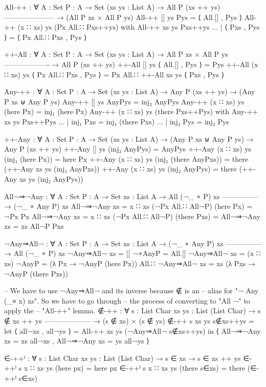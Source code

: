 \begin{code}
  All-++ : ∀ {A : Set} {P : A → Set} (xs ys : List A)
    → All P (xs ++ ys)
      ---------------------
    → (All P xs × All P ys)
  All-++ [] ys Pys = ⟨ All.[] , Pys ⟩
  All-++ (x ∷ xs) ys (Px All.∷ Pxs++ys) with All-++ xs ys Pxs++ys
  ... | ⟨ Pxs , Pys ⟩ = ⟨ Px All.∷ Pxs , Pys ⟩

  ++-All : ∀ {A : Set} {P : A → Set} (xs ys : List A)
    → All P xs × All P ys
      -------------------
    → All P (xs ++ ys)
  ++-All [] ys ⟨ All.[] , Pys ⟩ = Pys
  ++-All (x ∷ xs) ys ⟨ Px All.∷ Pxs , Pys ⟩ =
    Px All.∷ ++-All xs ys ⟨ Pxs , Pys ⟩

  Any-++ : ∀ {A : Set} {P : A → Set} (xs ys : List A)
    → Any P (xs ++ ys) → (Any P xs ⊎ Any P ys)
  Any-++ [] ys AnyPys = inj₂ AnyPys
  Any-++ (x ∷ xs) ys (here Px) = inj₁ (here Px)
  Any-++ (x ∷ xs) ys (there Pxs++Pys) with Any-++ xs ys Pxs++Pys
  ... | inj₁ Pxs = inj₁ (there Pxs)
  ... | inj₂ Pys = inj₂ Pys

  ++-Any : ∀ {A : Set} {P : A → Set} (xs ys : List A)
    → (Any P xs ⊎ Any P ys) → Any P (xs ++ ys)
  ++-Any [] ys (inj₂ AnyPys) = AnyPys
  ++-Any (x ∷ xs) ys (inj₁ (here Px)) = here Px
  ++-Any (x ∷ xs) ys (inj₁ (there AnyPxs)) = there (++-Any xs ys (inj₁ AnyPxs))
  ++-Any (x ∷ xs) ys (inj₂ AnyPys) = there (++-Any xs ys (inj₂ AnyPys))

  All¬⇒¬Any : ∀ {A : Set} {P : A → Set} {xs : List A}
    → All (¬_ ∘ P) xs
      ---------------
    → (¬_ ∘ Any P) xs
  All¬⇒¬Any {xs = x ∷ xs} (¬Px All.∷ All¬P) (here Px) = ¬Px Px
  All¬⇒¬Any {xs = x ∷ xs} (¬Px All.∷ All¬P) (there Pxs) =
    All¬⇒¬Any {xs = xs} All¬P Pxs

  ¬Any⇒All¬ : ∀ {A : Set} {P : A → Set} {xs : List A}
    → (¬_ ∘ Any P) xs
      ---------------
    → All (¬_ ∘ P) xs
  ¬Any⇒All¬ {xs = []} ¬∘AnyP = All.[]
  ¬Any⇒All¬ {xs = (x ∷ xs)} ¬AnyP =
    (λ Px → ¬AnyP (here Px))
      All.∷ ¬Any⇒All¬ {xs = xs} (λ Pxs → ¬AnyP (there Pxs))

  -- We have to use ¬Any⇒All¬ and its inverse because ∉ is an
  -- alias for "¬ Any (_≡ x) xs".  So we have to go through
  -- the process of converting to "All ¬" to apply the
  -- "All-++" lemma.
  ∉-++ : ∀ {s : List Char} {xs ys : List (List Char)}
    → s ∉ xs ++ ys
      --------------------
    → (s ∉ xs) × (s ∉ ys)
  ∉-++ {s} {xs} {ys} s∉xs++ys =
    let ⟨ all¬xs , all¬ys ⟩ = All-++ xs ys (¬Any⇒All¬ s∉xs++ys) in
      ⟨ All¬⇒¬Any {xs = xs} all¬xs
      , All¬⇒¬Any {xs = ys} all¬ys ⟩

  ∈-++ˡ : ∀ {s : List Char} {xs ys : List (List Char)}
    → s ∈ xs
    → s ∈ xs ++ ys
  ∈-++ˡ {s} {x ∷ xs} {ys} (here px) = here px
  ∈-++ˡ {s} {x ∷ xs} {ys} (there s∈xs) = there (∈-++ˡ s∈xs)


\end{code}

